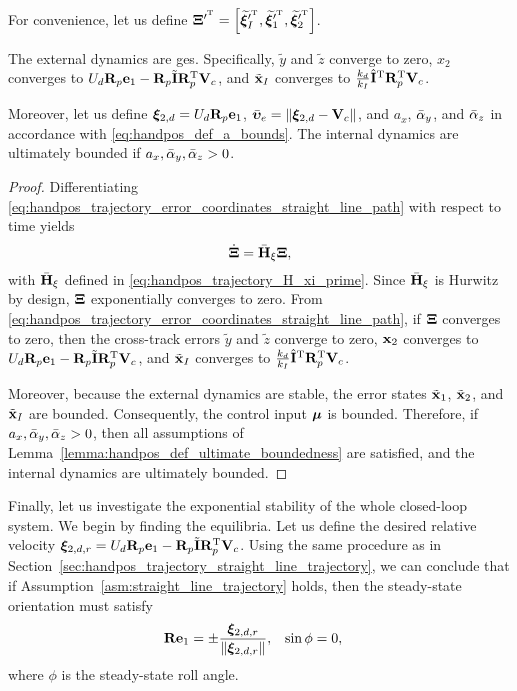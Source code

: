 For convenience, let us define $\bm{\Xi}^{\prime^{\mathrm{T}}} = \left[\widetilde{\bm{\xi}}_I^{\prime^{\mathrm{T}}}, \widetilde{\bm{\xi}}_1^{\prime^{\mathrm{T}}}, \widetilde{\bm{\xi}}_2^{\prime^{\mathrm{T}}}\right]$.
\begin{prop}
    The external dynamics are \gls{ges}.
    Specifically, $\widetilde{y}$ and $\widetilde{z}$ converge to zero, $x_2$ converges to $U_d \mathbf{R}_p \mathbf{e}_1 - \mathbf{R}_p \tilde{\mathbf{I}} \mathbf{R}_p^{\mathrm{T}} \mathbf{V}_c$, and $\tilde{\mathbf{x}}_I$ converges to $\frac{k_d}{k_I} \hat{\mathbf{I}}^{\mathrm{T}} \mathbf{R}_p^{\mathrm{T}} \mathbf{V}_c$.

    Moreover, let us define $\bm{\xi}_{2, d} = U_d \mathbf{R}_p \mathbf{e}_1$, $\Bar{\bm{\upsilon}}_e = \left\|\bm{\xi}_{2, d} - \mathbf{V}_c\right\|$, and $a_x$, $\Bar{\alpha}_y$, and $\Bar{\alpha}_z$ in accordance with \eqref{eq:handpos_def_a_bounds}.
    The internal dynamics are ultimately bounded if $a_x, \Bar{\alpha}_y, \Bar{\alpha}_z > 0$.
    \label{prop:straight_line_path}
\end{prop}
\begin{proof}
    Differentiating \eqref{eq:handpos_trajectory_error_coordinates_straight_line_path} with respect to time yields
    \begin{equation}
        \dot{\bm{\Xi}} = \Bar{\mathbf{H}}_{\xi} \bm{\Xi},
    \end{equation}
    with $\Bar{\mathbf{H}}_{\xi}$ defined in \eqref{eq:handpos_trajectory_H_xi_prime}.
    Since $\Bar{\mathbf{H}}_{\xi}$ is Hurwitz by design, $\bm{\Xi}$ exponentially converges to zero.
    From \eqref{eq:handpos_trajectory_error_coordinates_straight_line_path}, if $\bm{\Xi}$ converges to zero, then the cross-track errors $\widetilde{y}$ and $\widetilde{z}$ converge to zero, $\mathbf{x}_2$ converges to $U_d \mathbf{R}_p \mathbf{e}_1 - \mathbf{R}_p \tilde{\mathbf{I}} \mathbf{R}_p^{\mathrm{T}} \mathbf{V}_c$, and $\tilde{\mathbf{x}}_I$ converges to $\frac{k_d}{k_I} \hat{\mathbf{I}}^{\mathrm{T}} \mathbf{R}_p^{\mathrm{T}} \mathbf{V}_c$.

    Moreover, because the external dynamics are stable, the error states $\tilde{\mathbf{x}}_1$, $\tilde{\mathbf{x}}_2$, and $\tilde{\mathbf{x}}_I$ are bounded.
    Consequently, the control input $\bm{\mu}$ is bounded.
    Therefore, if $a_x, \Bar{\alpha}_y, \Bar{\alpha}_z > 0$, then all assumptions of Lemma~\ref{lemma:handpos_def_ultimate_boundedness} are satisfied, and the internal dynamics are ultimately bounded.
\end{proof}

Finally, let us investigate the exponential stability of the whole closed-loop system.
We begin by finding the equilibria.
Let us define the desired relative velocity $\bm{\xi}_{2, d, r} = U_d \mathbf{R}_p \mathbf{e}_1 - \mathbf{R}_p \tilde{\mathbf{I}} \mathbf{R}_p^{\mathrm{T}} \mathbf{V}_c$.
Using the same procedure as in Section~\ref{sec:handpos_trajectory_straight_line_trajectory}, we can conclude that if Assumption~\ref{asm:straight_line_trajectory} holds, then the steady-state orientation must satisfy
\begin{align}
    \mathbf{R}\mathbf{e}_1 &= \pm \frac{\bm{\xi}_{2, d, r}}{\left\|\bm{\xi}_{2, d, r}\right\|}, &
    \sin\phi &= 0,
\end{align}
where $\phi$ is the steady-state roll angle.

